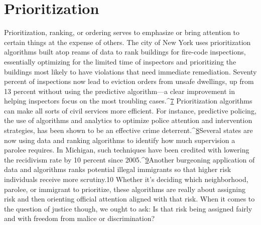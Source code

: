 \section{Prioritization }
Prioritization, ranking, or ordering serves to emphasize or bring attention to certain things at the expense of others. The city of New York uses prioritization algorithms built atop reams of data to rank buildings for fire-code inspections, essentially optimizing for the limited time of inspectors and prioritizing the buildings most likely to have violations that need immediate remediation. Seventy percent of inspections now lead to eviction orders from unsafe dwellings, up from 13 percent without using the predictive algorithm—a clear improvement in helping inspectors focus on the most troubling cases.^{\href{#endnotes}{7}}
Prioritization algorithms can make all sorts of civil services more efficient. For instance, predictive policing, the use of algorithms and analytics to optimize police attention and intervention strategies, has been shown to be an effective crime deterrent.^{\href{#endnotes}{8}}Several states are now using data and ranking algorithms to identify how much supervision a parolee requires. In Michigan, such techniques have been credited with lowering the recidivism rate by 10 percent since 2005.^{\href{#endnotes}{9}}Another burgeoning application of data and algorithms ranks potential illegal immigrants so that higher risk individuals receive more scrutiny.10 Whether it's deciding which neighborhood, parolee, or immigrant to prioritize, these algorithms are really about assigning risk and then orienting official attention aligned with that risk. When it comes to the question of justice though, we ought to ask: Is that risk being assigned fairly and with freedom from malice or discrimination? 
